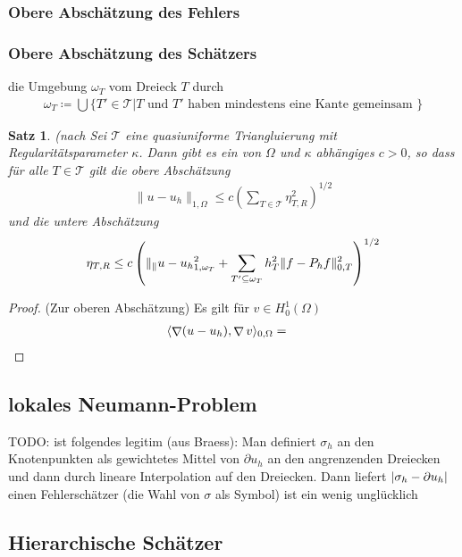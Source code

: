 \documentclass{scrartcl}
\newcounter{everything}
\newtheorem{theorem}[everything]{Satz}
\newcommand{\cT}{\mathcal{T}}
\newcommand{\norm}[1]{\lVert #1 \rVert}
\DeclareMathOperator{\grad}{\nabla}         %
\DeclarePairedDelimiter{\abs}{|}{|}
\DeclarePairedDelimiter{\inner}{\langle}{\rangle}
\begin{document}
\subsubsection*{Obere Abschätzung des Fehlers}

\subsubsection*{Obere Abschätzung des Schätzers}

 die Umgebung $\omega_T$ vom Dreieck $T$ durch
\begin{align*}
	\omega_T\coloneqq\bigcup\{T'\in\cT\vert T\text{ und }T'\text{ haben mindestens eine Kante gemeinsam }\}
\end{align*}

\begin{theorem}
	(nach \cite{Bra-2007}
	Sei $\cT$ eine quasiuniforme Triangluierung mit Regularitätsparameter $\kappa$. Dann gibt es ein von $\Omega$ und $\kappa$ abhängiges $c>0$, so dass für alle $T\in\cT$ gilt die obere Abschätzung
	\begin{align*}
		\norm{u-u_h}_{1,\Omega}\leq c\left(\sum_{T\in\cT}\eta_{T,R}^2\right)^{1/2}
	\end{align*}
	und die untere Abschätzung
	\begin{align*}
		\eta_{T,R}\leq c\left(\norm_{u-u_h}_{1,\omega_T}^2+\sum_{T'\subseteq\omega_T}h_T^2\norm{f-P_hf}_{0,T}^2\right)^{1/2}
	\end{align*}
\end{theorem}
\begin{proof}
	(Zur oberen Abschätzung)
	Es gilt für $v\in H_0^1(\Omega)$
	\begin{align*}
		\inner{\grad (u-u_h),\grad v}_{0,\Omega}
		&= 
	\end{align*}
\end{proof}


\subsection*{lokales Neumann-Problem}
TODO: ist folgendes legitim (aus Braess): Man definiert $\sigma_h$ an den Knotenpunkten als gewichtetes Mittel von $\partial u_h$ an den angrenzenden Dreiecken und dann durch lineare Interpolation auf den Dreiecken. Dann liefert $\abs{\sigma_h-\partial u_h}$ einen Fehlerschätzer (die Wahl von $\sigma$ als Symbol) ist ein wenig unglücklich
\subsection*{Hierarchische Schätzer}
\end{document}
